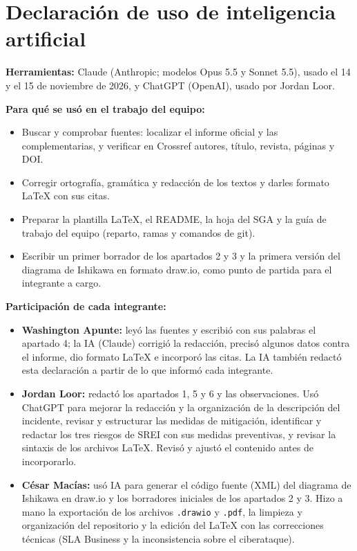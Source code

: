 \section*{Declaración de uso de inteligencia artificial}

\begingroup\footnotesize
\textbf{Herramientas:} Claude (Anthropic; modelos Opus 5.5 y Sonnet 5.5), usado el 14 y el 15 de noviembre de 2026, y ChatGPT (OpenAI), usado por Jordan Loor.

\textbf{Para qué se usó en el trabajo del equipo:}
\begin{itemize}
\item Buscar y comprobar fuentes: localizar el informe oficial y las complementarias, y verificar en Crossref autores, título, revista, páginas y DOI.
\item Corregir ortografía, gramática y redacción de los textos y darles formato LaTeX con sus citas.
\item Preparar la plantilla LaTeX, el README, la hoja del SGA y la guía de trabajo del equipo (reparto, ramas y comandos de git).
\item Escribir un primer borrador de los apartados 2 y 3 y la primera versión del diagrama de Ishikawa en formato draw.io, como punto de partida para el integrante a cargo.
\end{itemize}

\textbf{Participación de cada integrante:}
\begin{itemize}
\item \textbf{Washington Apunte:} leyó las fuentes y escribió con sus palabras el apartado 4; la IA (Claude) corrigió la redacción, precisó algunos datos contra el informe, dio formato LaTeX e incorporó las citas. La IA también redactó esta declaración a partir de lo que informó cada integrante.
\item \textbf{Jordan Loor:} redactó los apartados 1, 5 y 6 y las observaciones. Usó ChatGPT para mejorar la redacción y la organización de la descripción del incidente, revisar y estructurar las medidas de mitigación, identificar y redactar los tres riesgos de SREI con sus medidas preventivas, y revisar la sintaxis de los archivos LaTeX. Revisó y ajustó el contenido antes de incorporarlo.
\item \textbf{César Macías:} usó IA para generar el código fuente (XML) del diagrama de Ishikawa en draw.io y los borradores iniciales de los apartados 2 y 3. Hizo a mano la exportación de los archivos \texttt{.drawio} y \texttt{.pdf}, la limpieza y organización del repositorio y la edición del LaTeX con las correcciones técnicas (SLA Business y la inconsistencia sobre el ciberataque).
\end{itemize}
\endgroup
